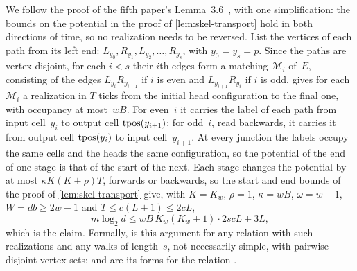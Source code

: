 \begin{outline}
We follow the proof of the fifth paper's Lemma~3.6~\cite{DirectedRecovery2026}, with one simplification: the bounds on
the potential in the proof of \cref{lem:skel-transport} hold in both directions of time, so no realization needs to be
reversed. List the vertices of each path from its left end: $L_{y_0},R_{y_1},L_{y_2},\dots,R_{y_s}$, with $y_0=y_s=p$.
Since the paths are vertex-disjoint, for each $i<s$ their $i$th edges form a matching $\mathcal M_i$ of~$E$, consisting
of the edges $L_{y_i}R_{y_{i+1}}$ if $i$ is even and $L_{y_{i+1}}R_{y_i}$ if $i$ is odd.  gives
for each $\mathcal M_i$ a realization in $T$ ticks from the initial head configuration to the final one, with occupancy
at most~$wB$. For even~$i$ it carries the label of each path from input cell~$y_i$ to output cell $\operatorname{tpos}(y_{i+1})$; for
odd~$i$, read backwards, it carries it from output cell $\operatorname{tpos}(y_i)$ to input cell~$y_{i+1}$. At every junction the
labels occupy the same cells and the heads the same configuration, so the potential of the end of one stage is that of
the start of the next. Each stage changes the potential by at most $\kappa K(K+\rho)T$, forwards or backwards, so the
start and end bounds of the proof of \cref{lem:skel-transport} give, with $K=K_w$, $\rho=1$, $\kappa=wB$, $\omega=w-1$,
$W=db\ge2w-1$ and $T\le c(L+1)\le2cL$,
\[
  m\log_2d\le wB\,K_w(K_w+1)\cdot2scL+3L,
\]
which is the claim. Formally,  is this argument for any relation with such
realizations and any walks of length~$s$, not necessarily simple, with pairwise disjoint vertex sets;
 and  are its forms for the relation
.
\end{outline}

